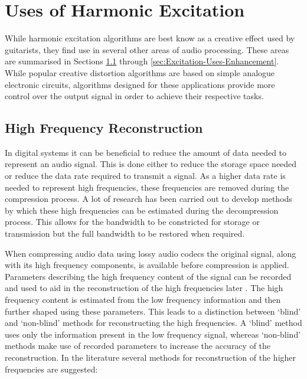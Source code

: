 \section{Uses of Harmonic Excitation}
\label{sec:Excitation-Uses}
	While harmonic excitation algorithms are best know as a creative effect used by guitarists, they find use in
	several other areas of audio processing. These areas are summarised in Sections
	\ref{sec:Excitation-Uses-Reconstruction} through \ref{sec:Excitation-Uses-Enhancement}. While popular creative
	distortion algorithms are based on simple analogue electronic circuits, algorithms designed for these applications
	provide more control over the output signal in order to achieve their respective tasks.

	\subsection{High Frequency Reconstruction}
	\label{sec:Excitation-Uses-Reconstruction}
		In digital systems it can be beneficial to reduce the amount of data needed to represent an audio signal.
		This is done either to reduce the storage space needed or reduce the data rate required to transmit a
		signal. As a higher data rate is needed to represent high frequencies, these frequencies are removed during
		the compression process. A lot of research has been carried out to develop methods by which these high
		frequencies can be estimated during the decompression process. This allows for the bandwidth to be
		constricted for storage or transmission but the full bandwidth to be restored when required.

		When compressing audio data using lossy audio codecs the original signal, along with its high frequency
		components, is available before compression is applied. Parameters describing the high frequency content of
		the signal can be recorded and used to aid in the reconstruction of the high frequencies later
		\citep{dietz2002spectral, friedrich2007spectral}. The high frequency content is estimated from the low
		frequency information and then further shaped using these parameters. This leads to a distinction between
		`blind' and `non-blind' methods for reconstructing the high frequencies. A `blind' method uses only the
		information present in the low frequency signal, whereas `non-blind' methods make use of recorded
		parameters to increase the accuracy of the reconstruction. In the literature several methods for
		reconstruction of the higher frequencies are suggested:

